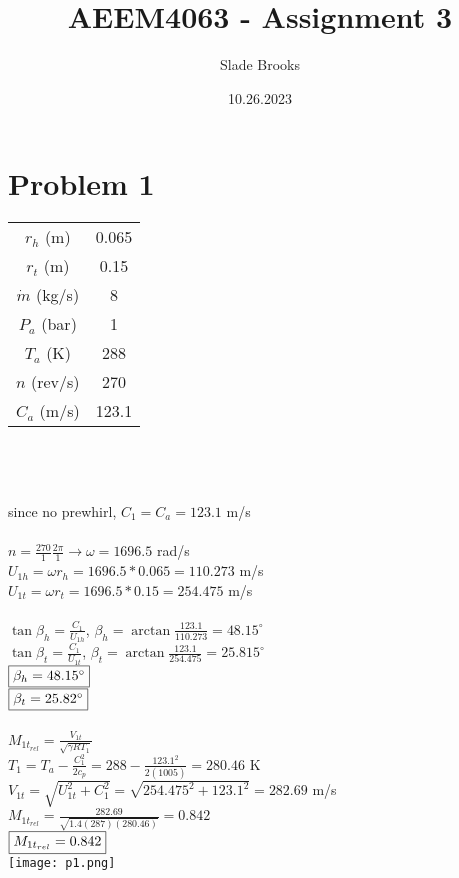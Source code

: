 \documentclass{article}
\title{AEEM4063 - Assignment 3}
\author{Slade Brooks}
\date{10.26.2023}
\begin{document}
\maketitle

\section*{Problem 1}
\begin{tabular}{cc}
    $r_h$ (m) & 0.065 \\
    $r_t$ (m) & 0.15 \\
    $\dot{m}$ (kg/s) & 8 \\
    $P_a$ (bar) & 1 \\
    $T_a$ (K) & 288 \\
    $n$ (rev/s) & 270 \\
    $C_a$ (m/s) & 123.1
\end{tabular} \\\\\\
since no prewhirl, $C_1=C_a=123.1$ m/s \\\\
$n=\frac{270}{1}\frac{2\pi}{1} \rightarrow \omega=1696.5$ rad/s \\
$U_{1h}=\omega r_h = 1696.5*0.065 = 110.273$ m/s \\
$U_{1t}=\omega r_t = 1696.5*0.15 = 254.475$ m/s \\\\
$\tan{\beta_h}=\frac{C_1}{U_{1h}}$, \quad $\beta_h=\arctan{\frac{123.1}{110.273}}
=48.15^\circ$ \\
$\tan{\beta_t}=\frac{C_1}{U_{1t}}$, \quad $\beta_t=\arctan{\frac{123.1}{254.475}}
=25.815^\circ$ \\
$\fbox{$\beta_{h}=48.15^\circ$}$ \\
$\fbox{$\beta_{t}=25.82^\circ$}$ \\\\
$M_{1t_{rel}}=\frac{V_{1t}}{\sqrt{\gamma R T_1}}$ \\
$T_1 = T_a - \frac{C_1^2}{2c_p}=288 - \frac{123.1^2}{2(1005)}=280.46$ K \\
$V_{1t}=\sqrt{U_{1t}^2 + C_1^2}=\sqrt{254.475^2 + 123.1^2}=282.69$ m/s \\
$M_{1t_{rel}}=\frac{282.69}{\sqrt{1.4(287)(280.46)}}=0.842$ \\
$\fbox{$M_{1t_{rel}}=0.842$}$ \\
\texttt{[image: p1.png]}
\end{document}
